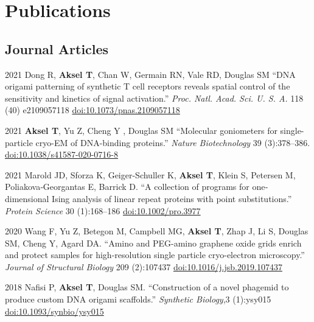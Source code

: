 \documentclass[12pt,letterpaper]{report}
\begin{document}
    \section*{Publications}

    \subsection*{Journal Articles}

    \begin{tablist}

        \item[2021] \tab{}Dong R, \textbf{Aksel T}, Chan W, Germain RN, Vale RD, Douglas SM \enquote{DNA origami patterning of synthetic T cell receptors reveals spatial control of the sensitivity and kinetics of signal activation.} \textit{Proc. Natl. Acad. Sci. U. S. A.} 118 (40) e2109057118 \href{https://doi.org/10.1073/pnas.2109057118}{doi:10.1073/pnas.2109057118}

        \item[2021] \tab{}\textbf{Aksel T}, Yu Z, Cheng Y , Douglas SM \enquote{Molecular goniometers for single-particle cryo-EM of DNA-binding proteins.} \textit{Nature Biotechnology} 39 (3):378--386. \href{https://doi.org/10.1038/s41587-020-0716-8}{doi:10.1038/s41587-020-0716-8}

        \item[2021] \tab{}Marold JD, Sforza K, Geiger-Schuller K, \textbf{Aksel T}, Klein S, Petersen M, Poliakova‐Georgantas E, Barrick D. \enquote{A collection of programs for one‐dimensional Ising analysis of linear repeat proteins with point substitutions.} \textit{Protein Science} 30 (1):168--186 \href{https://doi.org/10.1002/pro.3977}{doi:10.1002/pro.3977}

        \item[2020] \tab{}Wang F, Yu Z, Betegon M, Campbell MG, \textbf{Aksel T}, Zhap J, Li S, Douglas SM, Cheng Y, Agard DA. \enquote{Amino and PEG-amino graphene oxide grids enrich and protect samples for high-resolution single particle cryo-electron microscopy.} \textit{Journal of Structural Biology} 209 (2):107437 \href{https://doi.org/10.1016/j.jsb.2019.107437}{doi:10.1016/j.jsb.2019.107437}

        \item[2018] \tab{}Nafisi P, \textbf{Aksel T}, Douglas SM. \enquote{Construction of a novel phagemid to produce custom DNA origami scaffolds.} \textit{Synthetic Biology},3 (1):ysy015 \href{https://doi.org/10.1093/synbio/ysy015}{doi:10.1093/synbio/ysy015}


\end{tablist}
\end{document}

